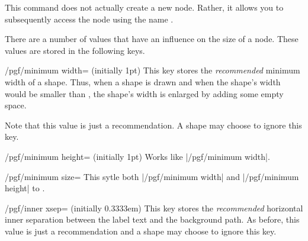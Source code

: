 \begin{command}{\pgfnodealias{}}
  This command does not actually create a new node. Rather, it allows
  you to subsequently access the node  using the
  name .
\end{command}

There are a number of values that have an influence on the size of a
node. These values are stored in the following keys.

\begin{key}{/pgf/minimum width= (initially 1pt)}
  This key stores the \emph{recommended} minimum width of a
  shape. Thus, when a shape is drawn and when the shape's width would
  be smaller than , the shape's width is enlarged by
  adding some empty space. 

  Note that this value is just a recommendation. A shape may choose to
  ignore this key.
  
\begin{codeexample}[]
\end{codeexample}
\end{key}

\begin{key}{/pgf/minimum height= (initially 1pt)}
  Works like |/pgf/minimum width|.
\end{key}

\begin{key}{/pgf/minimum size=}
  This sytle both |/pgf/minimum width| and |/pgf/minimum height| to .
\end{key}


\begin{key}{/pgf/inner xsep= (initially 0.3333em)}
  This key stores the \emph{recommended} horizontal
  inner separation between the label text and the background path. As
  before, this value is just a recommendation and a shape may choose
  to ignore this key.
  
\begin{codeexample}[]
\end{codeexample}
\end{key}

